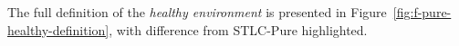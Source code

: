 

The full definition of the \emph{healthy environment} is presented in
Figure~\ref{fig:f-pure-healthy-definition}, with difference from
STLC-Pure highlighted.

